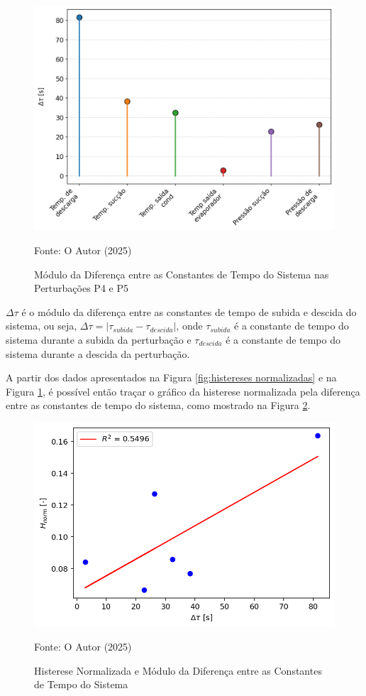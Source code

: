 \begin{figure}[h]
    \centering
    \includegraphics[width=1\linewidth]{FigurasdoTexto/Constantes de Tempo.png}
    \caption{Módulo da Diferença entre as Constantes de Tempo do Sistema nas Perturbações P4 e P5}
    \label{fig:Constantes de Tempo do Sistema}
    {\footnotesize Fonte: O Autor (2025)}
\end{figure}

 $\Delta \tau$ é o módulo da diferença entre as constantes de tempo de subida e descida do sistema, ou seja, $\Delta \tau = |\tau_{subida} - \tau_{descida}|$, onde $\tau_{subida}$ é a constante de tempo do sistema durante a subida da perturbação e $\tau_{descida}$ é a constante de tempo do sistema durante a descida da perturbação.

A partir dos dados apresentados na Figura \ref{fig:histereses normalizadas} e na Figura \ref{fig:Constantes de Tempo do Sistema}, é possível então traçar o gráfico da histerese normalizada pela diferença entre as constantes de tempo do sistema, como mostrado na Figura \ref{fig:HistNorm x Delta Tau}.

\newpage
\begin{figure}[h]
    \centering
    \includegraphics[width=1\linewidth]{FigurasdoTexto/HistNorm x Delta Tau.png}
    \caption{Histerese Normalizada e Módulo da Diferença entre as Constantes de Tempo do Sistema}
    \label{fig:HistNorm x Delta Tau}
    {\footnotesize Fonte: O Autor (2025)}
\end{figure}

